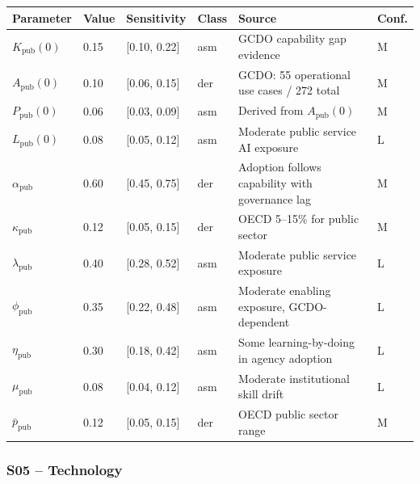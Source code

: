 \documentclass[11pt,a4paper]{article}
\begin{document}
\begin{center}
\begin{tabular}{llllll}
\toprule
Parameter & Value & Sensitivity & Class & Source & Conf.\\
\midrule
$K_{\text{pub}}(0)$ & 0.15 & [0.10, 0.22] & asm & GCDO capability gap evidence & M \\
$A_{\text{pub}}(0)$ & 0.10 & [0.06, 0.15] & der & GCDO: 55 operational use cases / 272 total & M \\
$P_{\text{pub}}(0)$ & 0.06 & [0.03, 0.09] & asm & Derived from $A_{\text{pub}}(0)$ & M \\
$L_{\text{pub}}(0)$ & 0.08 & [0.05, 0.12] & asm & Moderate public service AI exposure & L \\
$\alpha_{\text{pub}}$ & 0.60 & [0.45, 0.75] & der & Adoption follows capability with governance lag & M \\
$\kappa_{\text{pub}}$ & 0.12 & [0.05, 0.15] & der & OECD 5--15\% for public sector & M \\
$\lambda_{\text{pub}}$ & 0.40 & [0.28, 0.52] & asm & Moderate public service exposure & L \\
$\phi_{\text{pub}}$ & 0.35 & [0.22, 0.48] & asm & Moderate enabling exposure, GCDO-dependent & L \\
$\eta_{\text{pub}}$ & 0.30 & [0.18, 0.42] & asm & Some learning-by-doing in agency adoption & L \\
$\mu_{\text{pub}}$ & 0.08 & [0.04, 0.12] & asm & Moderate institutional skill drift & L \\
$\bar{p}_{\text{pub}}$ & 0.12 & [0.05, 0.15] & der & OECD public sector range & M \\
\bottomrule
\end{tabular}
\end{center}

\subsubsection*{S05 -- Technology}
\end{document}
